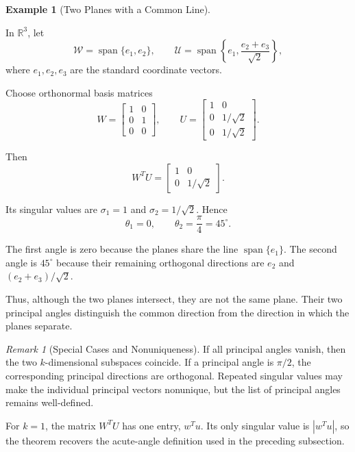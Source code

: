 \documentclass[14pt,letterpaper]{article}
\theoremstyle{plain}
\theoremstyle{definition}
\newtheorem{example}[theorem]{Example}
\theoremstyle{remark}
\newtheorem{remark}[theorem]{Remark}
\newcommand{\R}{\mathbb{R}}
\DeclareMathOperator{\Span}{span}
\begin{document}
\begin{example}[Two Planes with a Common Line]
\label{ex:principal_angles_planes}

In $\R^3$, let
\[
\mathcal W=\Span\{e_1,e_2\},\qquad
\mathcal U=\Span\left\{e_1,
\frac{e_2+e_3}{\sqrt2}\right\},
\]
where $e_1,e_2,e_3$ are the standard coordinate vectors.

Choose orthonormal basis matrices
\[
W=\begin{bmatrix}
1&0\\0&1\\0&0
\end{bmatrix},
\qquad
U=\begin{bmatrix}
1&0\\0&1/\sqrt2\\0&1/\sqrt2
\end{bmatrix}.
\]

Then
\[
\boxed{
W^TU=\begin{bmatrix}1&0\\0&1/\sqrt2\end{bmatrix}.
}
\]

Its singular values are $\sigma_1=1$ and
$\sigma_2=1/\sqrt2$. Hence
\[
\boxed{\theta_1=0,
\qquad\theta_2=\frac{\pi}{4}=45^\circ.}
\]

The first angle is zero because the planes share the
line $\Span\{e_1\}$. The second angle is $45^\circ$
because their remaining orthogonal directions are
$e_2$ and $(e_2+e_3)/\sqrt2$.

Thus, although the two planes intersect, they are not
the same plane. Their two principal angles distinguish
the common direction from the direction in which the
planes separate.

\end{example}

\begin{remark}[Special Cases and Nonuniqueness]

If all principal angles vanish, then the two
$k$-dimensional subspaces coincide. If a principal angle
is $\pi/2$, the corresponding principal directions are
orthogonal. Repeated singular values may make the
individual principal vectors nonunique, but the list
of principal angles remains well-defined.

For $k=1$, the matrix $W^TU$ has one entry, $w^Tu$.
Its only singular value is $|w^Tu|$, so the theorem
recovers the acute-angle definition used in the
preceding subsection.

\end{remark}
\end{document}
